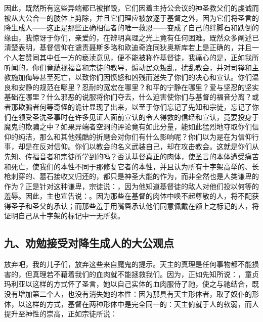 因此，既然所有这些异端都已被摧毁，它们因着主持公会议的神圣教父们的虔诚而被从大公合一的肢体上剪除，并且它们理应被放逐于基督之外，因为它们将圣言的降生成人——这正是那些正确相信者的唯一救恩——变成了自己的绊脚石和跌倒的缘由，我惊讶于你们，亲爱的，在辨明真理之光上竟有任何困难。既然众多阐述已清楚表明，基督信仰在谴责聂斯多略和欧迪奇连同狄奥斯库若上是正确的，并且一个人若赞同其中任一方的亵渎意见，便不能被称作基督徒，我痛心的是，正如我所听闻的，你们竟藐视福音和宗徒的教导，煽动民众叛乱，扰乱教会，并对司铎和主教施加侮辱甚至死亡，以致你们因愤怒和凶残而迷失了你们的决心和宣认。你们温良和安静的规范在哪里？忍耐的宽宏在哪里？和平的宁静在哪里？爱与坚忍的坚实基础在哪里？什么邪恶的说服将你们夺去，什么迫害使你们与基督的福音分离？或者那欺骗者何等奇怪的诡计显现了出来，以至于你们忘记了先知和宗徒，忘记了你们在领受圣洗圣事时在许多见证人面前宣认的令人得救的信经和宣认，竟要投身于魔鬼的欺骗之中？如果异端者空洞的评论竟有如此分量，能如此猛烈地夺取你们信仰的纯洁，那么和其他残酷的折磨会对你们有什么影响呢？你们以为是在为信仰行事，却是在反对信仰。你们以教会的名义武装自己，却在攻击教会。这就是你们从先知、传福音者和宗徒所学到的吗？否认基督真正的肉体，使圣言的本体遭受痛苦和死亡，使我们的本性不同于那修复它者的本性，并且认为所有十字架高举的、长枪刺穿的、墓石接收又归还的，都只是神圣大能的作为，而非全然也是人类谦卑的作为？正是针对这种谦卑，宗徒说：，因为他知道基督徒的敌人对他们投以何等的羞辱。因此，主也宣告说：。因为那些在基督的肉体中唤不起尊敬的人，将不配获得圣子和圣父的承认；而那些羞于用嘴唇承认他们同意佩戴在额上之标记的人，将证明自己从十字架的标记中一无所获。\par


\subsection{九、劝勉接受对降生成人的大公观点}

放弃吧，我的儿子们，放弃这些来自魔鬼的提示。天主的真理是任何事物都不能损害的，但真理若不藉着我们的血肉就不能拯救我们。因为，正如先知所说：，童贞玛利亚以这样的方式怀了圣言，她以自己实体的血肉服侍了祂，使之与祂结合，既没有增加第二个人，也没有消失她的本性：因为那具有天主形体者，取了奴仆的形体，以这样的方式，基督在两种形体中是完全同一的：天主俯就于人的软弱，而人提升至神性的崇高，正如宗徒所说：\par

